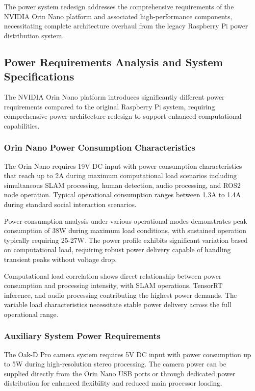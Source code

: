 The power system redesign addresses the comprehensive requirements of the NVIDIA Orin Nano platform and associated high-performance components, necessitating complete architecture overhaul from the legacy Raspberry Pi power distribution system.

\subsection{Power Requirements Analysis and System Specifications}

The NVIDIA Orin Nano platform introduces significantly different power requirements compared to the original Raspberry Pi system, requiring comprehensive power architecture redesign to support enhanced computational capabilities.

\subsubsection{Orin Nano Power Consumption Characteristics}

The Orin Nano requires 19V DC input with power consumption characteristics that reach up to 2A during maximum computational load scenarios including simultaneous SLAM processing, human detection, audio processing, and ROS2 node operation. Typical operational consumption ranges between 1.3A to 1.4A during standard social interaction scenarios.

Power consumption analysis under various operational modes demonstrates peak consumption of 38W during maximum load conditions, with sustained operation typically requiring 25-27W. The power profile exhibits significant variation based on computational load, requiring robust power delivery capable of handling transient peaks without voltage drop.

Computational load correlation shows direct relationship between power consumption and processing intensity, with SLAM operations, TensorRT inference, and audio processing contributing the highest power demands. The variable load characteristics necessitate stable power delivery across the full operational range.

\subsubsection{Auxiliary System Power Requirements}

The Oak-D Pro camera system requires 5V DC input with power consumption up to 5W during high-resolution stereo processing. The camera power can be supplied directly from the Orin Nano USB ports or through dedicated power distribution for enhanced flexibility and reduced main processor loading.

